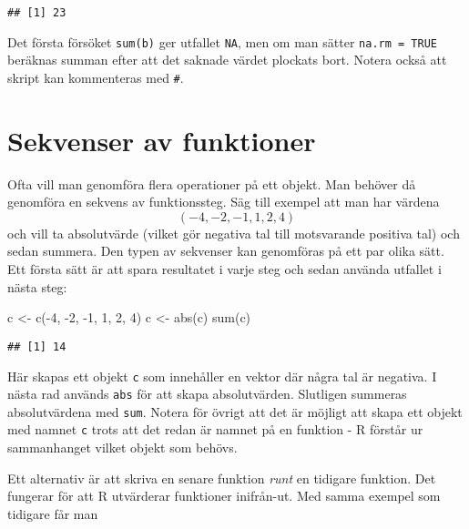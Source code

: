 \documentclass[
]{book}
\newenvironment{Shaded}{\begin{snugshade}}{\end{snugshade}}
\newcommand{\DecValTok}[1]{\textcolor[rgb]{0.00,0.00,0.81}{#1}}
\newcommand{\FunctionTok}[1]{\textcolor[rgb]{0.00,0.00,0.00}{#1}}
\newcommand{\NormalTok}[1]{#1}
\newcommand{\OtherTok}[1]{\textcolor[rgb]{0.56,0.35,0.01}{#1}}
\newcommand{\SpecialCharTok}[1]{\textcolor[rgb]{0.00,0.00,0.00}{#1}}
\theoremstyle{definition}
\theoremstyle{definition}
\theoremstyle{definition}
\theoremstyle{definition}
\theoremstyle{remark}
\begin{document}
\begin{verbatim}
## [1] 23
\end{verbatim}

Det första försöket \texttt{sum(b)} ger utfallet \texttt{NA}, men om man sätter \texttt{na.rm\ =\ TRUE} beräknas summan efter att det saknade värdet plockats bort. Notera också att skript kan kommenteras med \texttt{\#}.

\hypertarget{sekvenser-av-funktioner}{%
\section{Sekvenser av funktioner}\label{sekvenser-av-funktioner}}

Ofta vill man genomföra flera operationer på ett objekt. Man behöver då genomföra en sekvens av funktionssteg. Säg till exempel att man har värdena \[(-4, -2, -1, 1, 2, 4)\] och vill ta absolutvärde (vilket gör negativa tal till motsvarande positiva tal) och sedan summera.
Den typen av sekvenser kan genomföras på ett par olika sätt. Ett första sätt är att spara resultatet i varje steg och sedan använda utfallet i nästa steg:

\begin{Shaded}
\begin{Highlighting}[]
\NormalTok{c }\OtherTok{\textless{}{-}} \FunctionTok{c}\NormalTok{(}\SpecialCharTok{{-}}\DecValTok{4}\NormalTok{, }\SpecialCharTok{{-}}\DecValTok{2}\NormalTok{, }\SpecialCharTok{{-}}\DecValTok{1}\NormalTok{, }\DecValTok{1}\NormalTok{, }\DecValTok{2}\NormalTok{, }\DecValTok{4}\NormalTok{)}
\NormalTok{c }\OtherTok{\textless{}{-}} \FunctionTok{abs}\NormalTok{(c)}
\FunctionTok{sum}\NormalTok{(c)}
\end{Highlighting}
\end{Shaded}

\begin{verbatim}
## [1] 14
\end{verbatim}

Här skapas ett objekt \texttt{c} som innehåller en vektor där några tal är negativa. I nästa rad används \texttt{abs} för att skapa absolutvärden. Slutligen summeras absolutvärdena med \texttt{sum}.
Notera för övrigt att det är möjligt att skapa ett objekt med namnet \texttt{c} trots att det redan är namnet på en funktion - R förstår ur sammanhanget vilket objekt som behövs.

Ett alternativ är att skriva en senare funktion \emph{runt} en tidigare funktion. Det fungerar för att R utvärderar funktioner inifrån-ut. Med samma exempel som tidigare får man
\end{document}
